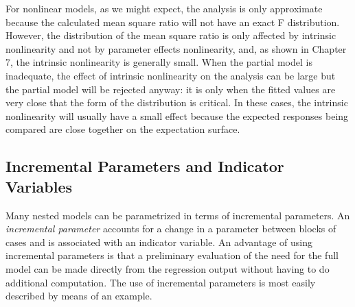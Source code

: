 For nonlinear models, as we might expect, the analysis is only
approximate because the calculated mean square ratio will not have
an exact F distribution.
However, the distribution of the mean square ratio is only
affected by intrinsic nonlinearity and not by parameter effects
nonlinearity,
and, as shown in Chapter 7, the intrinsic nonlinearity is generally small.
When the partial model is inadequate,
the effect of intrinsic nonlinearity on the analysis can be large but the
partial model will be rejected anyway:
it is only when the fitted values are very close that the form of the
distribution is critical.
In these cases, the intrinsic nonlinearity will usually
have a small effect because the expected responses being compared are close
together on the expectation surface.
\subsection{Incremental Parameters and Indicator Variables}

Many nested models can be parametrized in terms of incremental
parameters.
An \emph{incremental parameter} accounts for a
change in a parameter between blocks of cases and is
associated with an indicator variable.
An advantage of using incremental parameters is that a
preliminary evaluation of the need for the full model can
be made directly from the regression output without having
to do additional computation.
The use of incremental parameters is most easily described by
means of an example.

